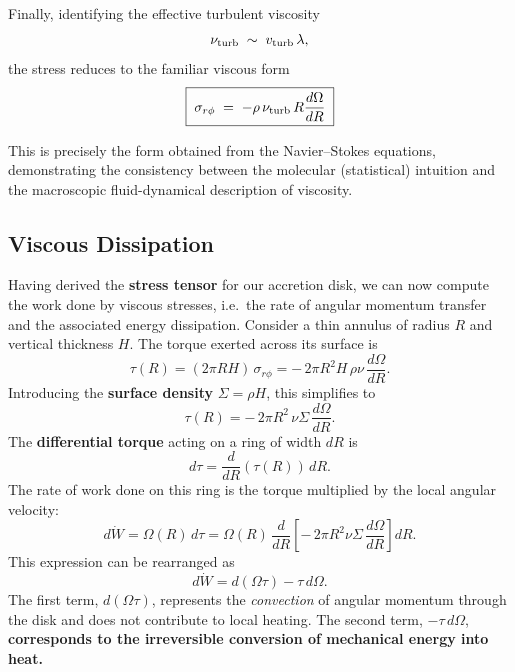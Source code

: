 Finally, identifying the effective turbulent viscosity
\[
\nu_{\rm turb} \;\sim\; v_{\rm turb}\,\lambda ,
\]
the stress reduces to the familiar viscous form
\[
\boxed{\;\sigma_{r\phi} \;=\; - \rho \,\nu_{\rm turb}\, R \frac{d\Omega}{dR}\;}
\]

This is precisely the form obtained from the Navier--Stokes equations, 
demonstrating the consistency between the molecular (statistical) intuition 
and the macroscopic fluid-dynamical description of viscosity.

\subsection{Viscous Dissipation}

Having derived the \textbf{stress tensor} for our accretion disk, we can now compute 
the work done by viscous stresses, i.e.\ the rate of angular momentum transfer and 
the associated energy dissipation. Consider a thin annulus of radius $R$ and vertical thickness $H$.  
The torque exerted across its surface is
\begin{equation}
\tau(R) = (2\pi R H)\,\sigma_{r\phi}
        = -\,2\pi R^2 H \,\rho \nu \,\frac{d\Omega}{dR}.
\end{equation}
Introducing the \textbf{surface density} $\Sigma = \rho H$, this simplifies to
\begin{equation}
\label{eq:disc_torque}
\tau(R) = -\,2\pi R^2 \,\nu \Sigma \,\frac{d\Omega}{dR}.
\end{equation}
The \textbf{differential torque} acting on a ring of width $dR$ is
\begin{equation}
d\tau = \frac{d}{dR}\!\left(\tau(R)\right)\, dR.
\end{equation}
The rate of work done on this ring is the torque multiplied by the
local angular velocity:
\begin{equation}
d\dot{W} = \Omega(R)\, d\tau
          = \Omega(R)\,\frac{d}{dR}\!\left[-\,2\pi R^2 \nu \Sigma \,\frac{d\Omega}{dR}\right] dR.
\end{equation}
This expression can be rearranged as
\begin{equation}
d\dot{W} = d(\Omega \tau) - \tau\, d\Omega.
\end{equation}
The first term, $d(\Omega \tau)$, represents the \emph{convection} of angular momentum 
through the disk and does not contribute to local heating.  
The second term, $-\tau\,d\Omega$, \textbf{corresponds to the irreversible 
conversion of mechanical energy into heat.}

